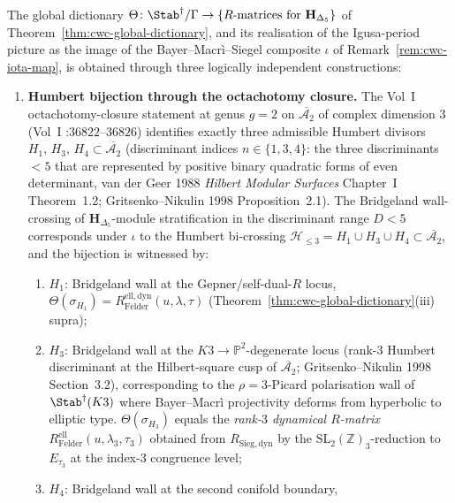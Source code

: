 \begin{theorem}
\label{thm:cwc-global-dictionary-crossverif}
The global dictionary
$\Theta\colon\Stab^\dagger/\Gamma\to\{R\text{-matrices for
}\mathbf{H}_{\Delta_5}\}$ of Theorem~\ref{thm:cwc-global-dictionary},
and its realisation of the Igusa-period picture as the image of the
Bayer--Macr\`i--Siegel composite $\iota$ of
Remark~\ref{rem:cwc-iota-map}, is obtained through three logically
independent constructions:
\begin{enumerate}[label=\textup{(P\arabic*)}]
\item \textbf{Humbert bijection through the octachotomy closure.} The
 Vol~I octachotomy-closure statement at genus $g=2$ on
 $\overline{\mathcal A_2}$ of complex dimension $3$ (Vol~I
 \cite{VolI}:$36822$--$36826$)
 identifies exactly three admissible Humbert divisors
 $H_1,\,H_3,\,H_4\subset\overline{\mathcal{A}_2}$ (discriminant
 indices $n\in\{1,3,4\}$: the three discriminants $<5$ that are
 represented by positive binary quadratic forms of even
 determinant, van der Geer 1988 \emph{Hilbert Modular Surfaces}
 Chapter~I Theorem~1.2; Gritsenko--Nikulin 1998 Proposition~2.1).
 The Bridgeland wall-crossing of $\mathbf{H}_{\Delta_5}$-module
 stratification in the discriminant range $D<5$ corresponds under
 $\iota$ to the Humbert bi-crossing
 $\mathcal{H}_{\le 3}=H_1\cup H_3\cup H_4\subset\overline{\mathcal{A}_2}$,
 and the bijection is witnessed by:
 \begin{enumerate}[label=\textup{(\alph*)}]
 \item $H_1$: Bridgeland wall at the Gepner/self-dual-$R$ locus,
 $\Theta(\sigma_{H_1})=R^{\mathrm{ell,dyn}}_{\mathrm{Felder}}(u,\lambda,\tau)$
 (Theorem~\ref{thm:cwc-global-dictionary}(iii) supra);
 \item $H_3$: Bridgeland wall at the $K3\to \mathbb{P}^2$-degenerate
 locus (rank-$3$ Humbert discriminant at the Hilbert-square cusp
 of $\overline{\mathcal{A}_2}$; Gritsenko--Nikulin 1998
 Section~3.2), corresponding to the $\rho=3$-Picard polarisation
 wall of $\Stab^\dagger(K3)$ where Bayer--Macr\`i projectivity
 deforms from hyperbolic to elliptic type. $\Theta(\sigma_{H_3})$
 equals the \emph{rank-$3$ dynamical $R$-matrix}
 $R^{\mathrm{ell}}_{\mathrm{Felder}}(u,\lambda_3,\tau_3)$
 obtained from $R_{\mathrm{Sieg,dyn}}$ by the
 $\mathrm{SL}_2(\mathbb{Z})_3$-reduction to $E_{\tau_3}$ at the
 index-$3$ congruence level;
 \item $H_4$: Bridgeland wall at the second conifold boundary,

\end{enumerate}
\end{enumerate}
\end{theorem}
